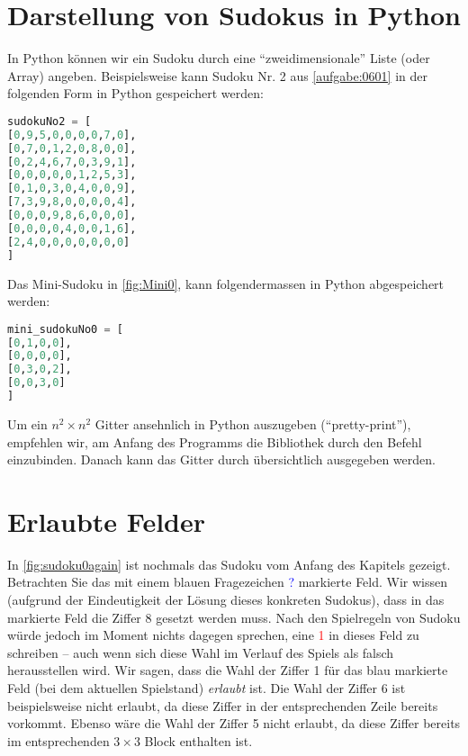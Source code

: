 \section{Darstellung von Sudokus in Python}
In Python können wir ein Sudoku durch eine \enquote{zweidimensionale} Liste (oder Array) angeben. Beispielsweise kann Sudoku Nr. 2 aus \cref{aufgabe:0601} in der folgenden Form in Python gespeichert werden:
\begin{lstlisting}[language=Python,caption=Abspeichern von Sudoku-Gittern in Python,numbers=none]
sudokuNo2 = [
[0,9,5,0,0,0,0,7,0],
[0,7,0,1,2,0,8,0,0],
[0,2,4,6,7,0,3,9,1],
[0,0,0,0,0,1,2,5,3],
[0,1,0,3,0,4,0,0,9],
[7,3,9,8,0,0,0,0,4],
[0,0,0,9,8,6,0,0,0],
[0,0,0,0,4,0,0,1,6],
[2,4,0,0,0,0,0,0,0]
]
\end{lstlisting}
\noindent
Das Mini-Sudoku in \cref{fig:Mini0}, kann folgendermassen in Python abgespeichert werden:
\begin{lstlisting}[language=Python,caption=Abspeichern von Mini-Sudoku-Gittern in Python,numbers=none]
mini_sudokuNo0 = [
[0,1,0,0],
[0,0,0,0],
[0,3,0,2],
[0,0,3,0]
]
\end{lstlisting}
Um ein $n^2\times n^2$ Gitter ansehnlich in Python auszugeben (\enquote{pretty-print}), empfehlen wir, am Anfang des Programms die Bibliothek  durch den Befehl  einzubinden. Danach kann das Gitter durch  übersichtlich ausgegeben werden.


\section{Erlaubte Felder}
In \cref{fig:sudoku0again} ist nochmals das Sudoku vom Anfang des Kapitels gezeigt. Betrachten Sie das mit einem blauen Fragezeichen \textcolor{Blue}{?} markierte Feld. Wir wissen (aufgrund der Eindeutigkeit der Lösung dieses konkreten Sudokus), dass in das markierte Feld die Ziffer 8 gesetzt werden muss. Nach den Spielregeln von Sudoku würde jedoch im Moment nichts dagegen sprechen, eine \textcolor{Red}{1} in dieses Feld zu schreiben -- auch wenn sich diese Wahl im Verlauf des Spiels als falsch herausstellen wird. Wir sagen, dass die Wahl der Ziffer 1 für das blau markierte Feld (bei dem aktuellen Spielstand) \textit{erlaubt} ist. Die Wahl der Ziffer 6 ist beispielsweise nicht erlaubt, da diese Ziffer in der entsprechenden Zeile bereits vorkommt. Ebenso wäre die Wahl der Ziffer 5 nicht erlaubt, da diese Ziffer bereits im entsprechenden $3\times 3$ Block enthalten ist.

